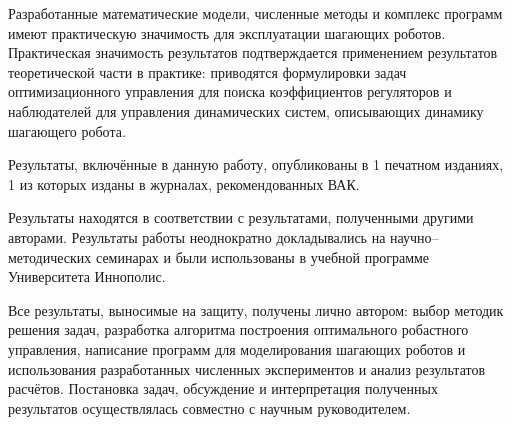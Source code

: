 Разработанные математические модели, численные методы и комплекс программ имеют практическую значимость для эксплуатации шагающих роботов. Практическая значимость результатов подтверждается применением результатов теоретической части в практике: приводятся формулировки задач оптимизационного управления для поиска коэффициентов регуляторов и наблюдателей для управления динамических систем, описывающих динамику шагающего робота. 

{\reliability} 

Результаты, включённые в данную работу, опубликованы в 1 печатном изданиях, 1 из которых изданы в журналах, рекомендованных ВАК.
\begin{comment}
, 1 --- в периодических научных журналах, индексируемых \textit{Web of Science} и \textit{Scopus}. 
\end{comment}

Результаты находятся в соответствии с результатами, полученными другими авторами. Результаты работы неоднократно докладывались на научно--методических семинарах и были использованы в учебной программе Университета Иннополис.

{\contribution} 

Все результаты, выносимые на защиту, получены лично автором: выбор методик решения задач, разработка алгоритма построения оптимального робастного управления, написание программ для моделирования шагающих роботов и использования разработанных численных экспериментов и анализ результатов расчётов. Постановка задач, обсуждение и интерпретация полученных результатов осуществлялась совместно с научным руководителем.